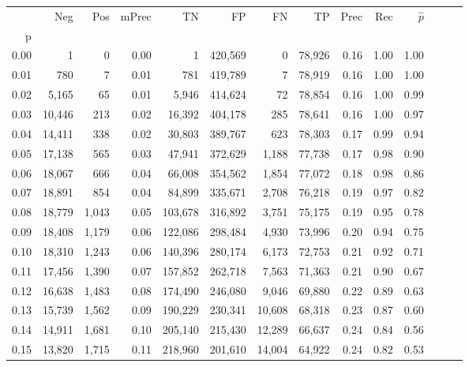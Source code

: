 \begin{tabular}{rrrrrrrrrrrrrr}
\toprule
{} &     Neg &    Pos & mPrec &       TN &       FP &      FN &      TP &  Prec &   Rec & $\hat{p}$ \\
p    &         &        &       &          &          &         &         &       &       &           \\
\midrule
0.00 &       1 &      0 &  0.00 &        1 &  420,569 &       0 &  78,926 &  0.16 &  1.00 &      1.00 \\
0.01 &     780 &      7 &  0.01 &      781 &  419,789 &       7 &  78,919 &  0.16 &  1.00 &      1.00 \\
0.02 &   5,165 &     65 &  0.01 &    5,946 &  414,624 &      72 &  78,854 &  0.16 &  1.00 &      0.99 \\
0.03 &  10,446 &    213 &  0.02 &   16,392 &  404,178 &     285 &  78,641 &  0.16 &  1.00 &      0.97 \\
0.04 &  14,411 &    338 &  0.02 &   30,803 &  389,767 &     623 &  78,303 &  0.17 &  0.99 &      0.94 \\
0.05 &  17,138 &    565 &  0.03 &   47,941 &  372,629 &   1,188 &  77,738 &  0.17 &  0.98 &      0.90 \\
0.06 &  18,067 &    666 &  0.04 &   66,008 &  354,562 &   1,854 &  77,072 &  0.18 &  0.98 &      0.86 \\
0.07 &  18,891 &    854 &  0.04 &   84,899 &  335,671 &   2,708 &  76,218 &  0.19 &  0.97 &      0.82 \\
0.08 &  18,779 &  1,043 &  0.05 &  103,678 &  316,892 &   3,751 &  75,175 &  0.19 &  0.95 &      0.78 \\
0.09 &  18,408 &  1,179 &  0.06 &  122,086 &  298,484 &   4,930 &  73,996 &  0.20 &  0.94 &      0.75 \\
0.10 &  18,310 &  1,243 &  0.06 &  140,396 &  280,174 &   6,173 &  72,753 &  0.21 &  0.92 &      0.71 \\
0.11 &  17,456 &  1,390 &  0.07 &  157,852 &  262,718 &   7,563 &  71,363 &  0.21 &  0.90 &      0.67 \\
0.12 &  16,638 &  1,483 &  0.08 &  174,490 &  246,080 &   9,046 &  69,880 &  0.22 &  0.89 &      0.63 \\
0.13 &  15,739 &  1,562 &  0.09 &  190,229 &  230,341 &  10,608 &  68,318 &  0.23 &  0.87 &      0.60 \\
0.14 &  14,911 &  1,681 &  0.10 &  205,140 &  215,430 &  12,289 &  66,637 &  0.24 &  0.84 &      0.56 \\
0.15 &  13,820 &  1,715 &  0.11 &  218,960 &  201,610 &  14,004 &  64,922 &  0.24 &  0.82 &      0.53 \\

\end{tabular}
